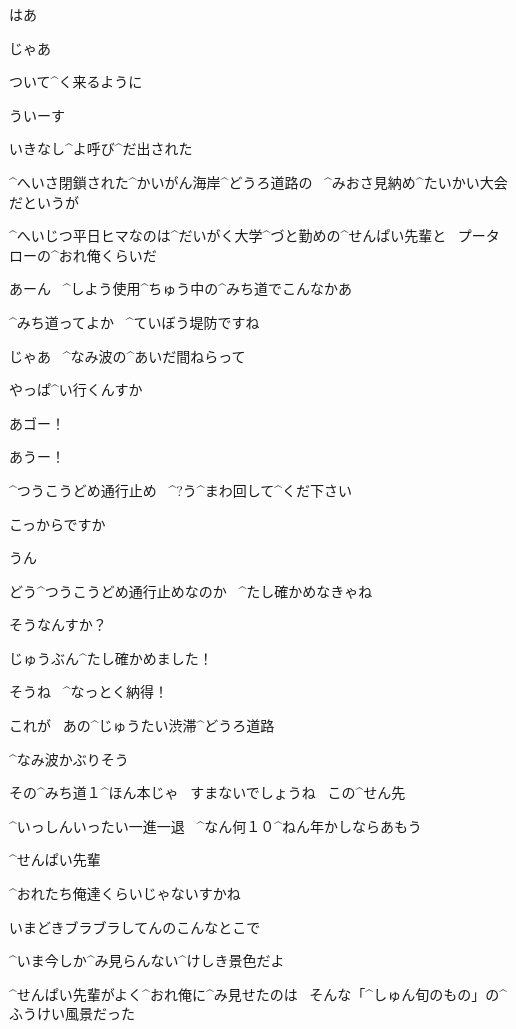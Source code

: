 \Ojisan はあ

\page
\Sensei じゃあ

\Sensei ついて^{く}{来}るように

\Ojisan ういーす

\Ojisan いきなし^{よ}{呼}び^{だ}{出}された

\Ojisan ^{へいさ}{閉鎖}された^{かいがん}{海岸}^{どうろ}{道路}の
\ ^{みおさ}{見納}め^{たいかい}{大会}だというが

\Ojisan ^{へいじつ}{平日}ヒマなのは^{だいがく}{大学}^{づと}{勤}めの^{せんぱい}{先輩}と
\ プータローの^{おれ}{俺}くらいだ

\page
\Sensei あーん
\ ^{しよう}{使用}^{ちゅう}{中}の^{みち}{道}でこんなかあ

\Ojisan ^{みち}{道}ってよか
\ ^{ていぼう}{堤防}ですね

\page
\Sensei じゃあ
\ ^{なみ}{波}の^{あいだ}{間}ねらって

\Ojisan やっぱ^{い}{行}くんすか

\Sensei あゴー！

\Ojisan あうー！

\page
\Sign ^{つうこうどめ}{通行止め}
\ ^{?}{う}^{まわ}{回}して^{くだ}{下}さい

\Ojisan こっからですか

\Sensei うん

\Sensei どう^{つうこうどめ}{通行止め}なのか
\ ^{たし}{確}かめなきゃね

\Ojisan そうなんすか？

\page
\Ojisan じゅうぶん^{たし}{確}かめました！

\Sensei そうね
\ ^{なっとく}{納得}！

\page
\Sensei これが
\ あの^{じゅうたい}{渋滞}^{どうろ}{道路}

\Sensei ^{なみ}{波}かぶりそう

\Ojisan その^{みち}{道}１^{ほん}{本}じゃ
\ すまないでしょうね
\ この^{せん}{先}

\Sensei ^{いっしんいったい}{一進一退}
\ ^{なん}{何}１０^{ねん}{年}かしならあもう

\page
\Ojisan ^{せんぱい}{先輩}

\Ojisan ^{おれたち}{俺達}くらいじゃないすかね

\Ojisan いまどきブラブラしてんのこんなとこで

\Sensei ^{いま}{今}しか^{み}{見}らんない^{けしき}{景色}だよ

\Ojisan ^{せんぱい}{先輩}がよく^{おれ}{俺}に^{み}{見}せたのは
\ そんな「^{しゅん}{旬}のもの」の^{ふうけい}{風景}だった

